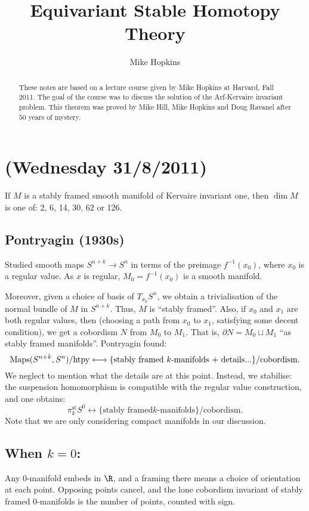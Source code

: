 \documentclass[11pt]{article}
\title{Equivariant Stable Homotopy Theory}
\author{Mike Hopkins}
\date{}
\newcommand{\NewLecture}[3]{\section{#1 {\small(#2/#3/2011)}}}
\begin{document}
\maketitle
\begin{abstract}
These notes are based on a lecture course given by Mike Hopkins at Harvard, Fall 2011. The goal of the course was to discuss the solution of the Arf-Kervaire invariant problem. This theorem was proved by Mike Hill, Mike Hopkins and Doug Ravanel after $50$ years of mystery.
\end{abstract}
\tableofcontents
\pagebreak
\NewLecture{}{Wednesday 31}{8}
\begin{thm*}
If $M$ is a stably framed smooth manifold of Kervaire invariant one, then $\dim
M$ is one of: 2, 6, 14, 30, 62 or 126.
\end{thm*}
\subsection*{Pontryagin (1930s)}
Studied smooth maps $S^{n+k}\to S^n$ in terms
of the preimage $f^{-1}(x_0)$, where $x_0$ is a regular value. As $x$ is
regular, $M_0=f^{-1}(x_0)$ is a smooth manifold.

Moreover, given a choice of basis of $T_{x_0}S^n$, we obtain a trivialisation of
the normal bundle of $M$ in $S^{n+k}$. Thus, $M$ is ``stably framed''. Also, if
$x_0$ and $x_1$ are both regular values, then (choosing a path from $x_0$ to
$x_1$, satisfying some decent condition), we get a cobordism $N$ from $M_0$ to
$M_1$. That is, $\partial N=M_0\sqcup M_1$ ``as stably framed manifolds''.
Pontryagin found:
\[\operatorname{Maps}(S^{n+k},S^n)/\text{htpy}\longleftrightarrow\{\text{stably framed
$k$-manifolds + details...}\}/\text{cobordism}.\]
We neglect to mention what the details are at this point. Instead, we stabilise:
the suspension homomorphism is compatible with the regular value construction,
and one obtains:
\[\pi_k^\text{st}S^0\longleftrightarrow\{\text{stably framed
$k$-manifolds}\}/\text{cobordism}.\]
Note that we are only considering compact manifolds in our discussion.
\subsection*{When \texorpdfstring{$k=0$}{k=0}:}
Any $0$-manifold embeds in $\R$, and a framing there means a choice of
orientation at each point. Opposing points cancel, and the lone cobordism
invariant of stably framed $0$-manifolds is the number of points, counted with
sign.
\end{document}
